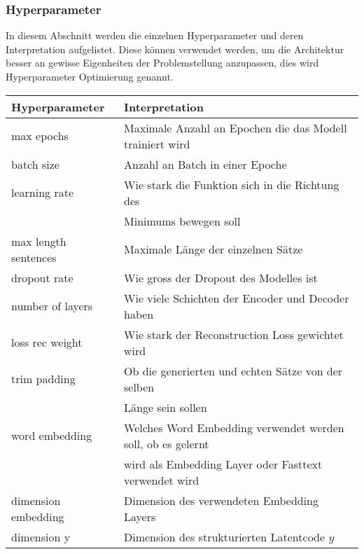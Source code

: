 \subsubsection{Hyperparameter}
\label{sub:crontrol_gen_hyperparameter}
In diesem Abschnitt werden die einzelnen Hyperparameter und deren Interpretation aufgelistet. Diese können verwendet
werden, um die Architektur besser an gewisse Eigenheiten der Problemstellung anzupassen, dies wird Hyperparameter
Optimierung genannt.
\begin{table}[ht]
	\centering
	\begin{tabular}{| l | l |}
	\hline
	\textbf{Hyperparameter} & \textbf{Interpretation}                                     \\ \hline
	max epochs              & Maximale Anzahl an Epochen die das Modell trainiert wird    \\ \hline
	batch size              & Anzahl an Batch in einer Epoche                             \\ \hline
	learning rate           & Wie stark die Funktion sich in die Richtung des             \\ 
	                        & Minimums bewegen soll                                       \\ \hline
    max length sentences    & Maximale Länge der einzelnen Sätze                          \\ \hline  
	dropout rate            & Wie gross der Dropout des Modelles ist                      \\ \hline
	number of layers        & Wie viele Schichten der Encoder und Decoder haben           \\ \hline
	loss rec weight         & Wie stark der Reconstruction Loss gewichtet wird            \\ \hline
	trim padding            & Ob die generierten und echten Sätze von der selben          \\
	                        & Länge sein sollen                                           \\ \hline
	word embedding          & Welches Word Embedding verwendet werden soll, ob es gelernt \\
	                        & wird als Embedding Layer oder Fasttext verwendet wird       \\ \hline
	dimension embedding     & Dimension des verwendeten Embedding Layers                  \\ \hline
	dimension y             & Dimension des strukturierten Latentcode $y$                 \\ \hline

\end{tabular}
\end{table}
